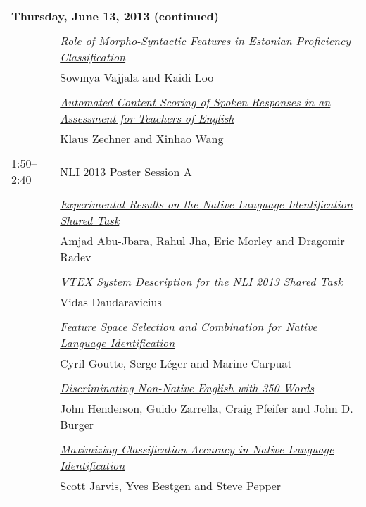 \begin{tabular}{p{20mm}p{138mm}}
\\
\multicolumn{2}{l}{\bf Thursday, June 13, 2013
 (continued)} \\\\
 & \hyperlink{page.63}{\em Role of Morpho-Syntactic Features in Estonian Proficiency Classification}\\
         & Sowmya Vajjala and Kaidi Loo \\
\\

 & \hyperlink{page.73}{\em Automated Content Scoring of Spoken Responses in an Assessment for Teachers of English}\\
         & Klaus Zechner and Xinhao Wang \\
\\

1:50--2:40 & NLI 2013 Poster Session A
 \\
\\
 & \hyperlink{page.82}{\em Experimental Results on the Native Language Identification Shared Task}\\
         & Amjad Abu-Jbara, Rahul Jha, Eric Morley and Dragomir Radev \\
\\

 & \hyperlink{page.89}{\em VTEX System Description for the NLI 2013 Shared Task}\\
         & Vidas Daudaravicius \\
\\

 & \hyperlink{page.96}{\em Feature Space Selection and Combination for Native Language Identification}\\
         & Cyril Goutte, Serge L\'{e}ger and Marine Carpuat \\
\\

 & \hyperlink{page.101}{\em Discriminating Non-Native English with 350 Words}\\
         & John Henderson, Guido Zarrella, Craig Pfeifer and John D. Burger \\
\\

 & \hyperlink{page.111}{\em Maximizing Classification Accuracy in Native Language Identification}\\
         & Scott Jarvis, Yves Bestgen and Steve Pepper \\
\\


\end{tabular}
